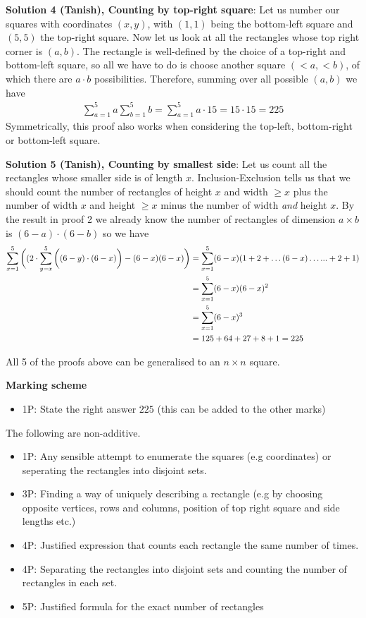 {\textbf{Solution 4 (Tanish), Counting by top-right square}: Let us number our squares with coordinates $(x, y)$, with $(1,1)$ being the bottom-left square and $(5,5)$ the top-right square. Now let us look at all the rectangles whose top right corner is $(a, b)$. The rectangle is well-defined by the choice of a top-right and bottom-left square, so all we have to do is choose another square  $(<a, <b)$, of which there are $a \cdot b$ possibilities. Therefore, summing over all possible $(a, b)$ we have
\begin{align*}
    \sum_{a=1}^5 a \sum_{b=1}^5 b = \sum_{a=1}^5 a \cdot 15 = 15\cdot15 = 225
\end{align*}
Symmetrically, this proof also works when considering the top-left, bottom-right or bottom-left square.

\textbf{Solution 5 (Tanish), Counting by smallest side}: Let us count all the rectangles whose smaller side is of length $x$. Inclusion-Exclusion tells us that we should count the number of rectangles of height $x$ and width $\geq x$ plus the number of width $x$ and height $\geq x$ minus the number of width \emph{and} height $x$. By the result in proof 2 we already know the number of rectangles of dimension $a \times b$ is $(6-a) \cdot (6-b)$ so we have
\begin{align*}
    \sum_{x=1}^5 \bigg{(}( 2\cdot\sum_{y=x}^5 \bigg{(}(6-y)\cdot(6-x)\bigg{)} - (6-x)(6-x) \bigg{)} &= \sum_{x=1}^5 (6-x)(1 + 2 + \hdots (6-x) \hdots ... + 2 + 1) 
    \\ &= \sum_{x=1}^5 (6-x)(6-x)^2 
    \\ &= \sum_{x=1}^5 (6-x)^3 
    \\ &= 125 + 64 + 27 + 8 + 1 = 225
\end{align*}

All 5 of the proofs above can be generalised to an $n \times n$ square. 

\newpage

\textbf{Marking scheme}%
\begin{itemize}
    \item 1P: State the right answer $225$ (this can be added to the other marks)
\end{itemize}
The following are non-additive.
\begin{itemize}
    \item 1P: Any sensible attempt to enumerate the squares (e.g coordinates) or seperating the rectangles into disjoint sets.
    \item 3P: Finding a way of uniquely describing a rectangle (e.g by choosing opposite vertices, rows and columns, position of top right square and side lengths etc.)
    \item 4P: Justified expression that counts each rectangle the same number of times.
    \item 4P: Separating the rectangles into disjoint sets and counting the number of rectangles in each set.
    \item 5P: Justified formula for the exact number of rectangles
\end{itemize} 

}
